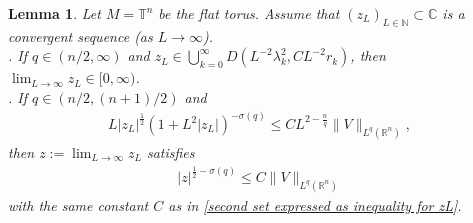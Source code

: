 \documentclass[12pt]{amsart}
\newcommand{\N}{{\mathbb N}}
\newcommand{\R}{{\mathbb R}}
\newcommand{\C}{{\mathbb C}}
\newtheorem{lemma}[theorem]{Lemma}
\begin{document}
\begin{lemma}\label{lemma scaling limit}
 Let $M =\mathbb{T}^n$ be the flat torus. Assume that $(z_L)_{L\in\N}\subset\C$ is a convergent sequence (as $L\to\infty$).\\

 . If $q\in (n/2,\infty)$ and $z_L\in \bigcup_{k=0}^{\infty}D(L^{-2}\lambda_k^2,CL^{-2}r_k)$, then 
 $\lim_{L\to\infty}z_L\in [0,\infty)$.\\


 . If $q\in (n/2,(n+1)/2)$ and 
\begin{align}\label{second set expressed as inequality for zL}
    L|z_L|^{\frac{1}{2}}(1+L^2|z_L|)^{-\sigma(q)}\leq C L^{2-\frac{n}{q}}\|V\|_{L^q(\R^n)},
\end{align}
then $z:=\lim_{L\to\infty} z_L$ satisfies 
\begin{align}\label{second set limit}
    |z|^{\frac{1}{2}-\sigma(q)}\leq C\|V\|_{L^q(\R^n)}
\end{align}
with the same constant $C$ as in \eqref{second set expressed as inequality for zL}.
\end{lemma}
\end{document}
